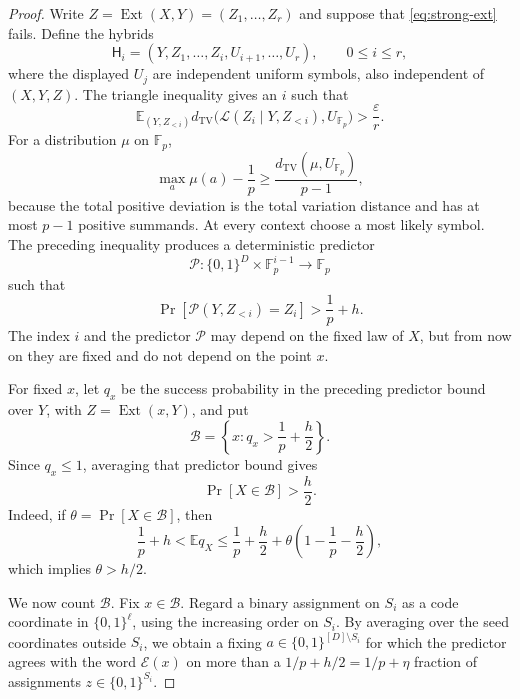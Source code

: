 \documentclass[11pt]{article}
\numberwithin{equation}{section}
\theoremstyle{definition}
\theoremstyle{remark}
\newcommand{\F}{\mathbb F}
\newcommand{\TV}{d_{\mathrm{TV}}}
\newcommand{\Ext}{\operatorname{Ext}}
\begin{document}
\begin{proof}
Write $Z=\Ext(X,Y)=(Z_1,\ldots,Z_r)$ and suppose that
\eqref{eq:strong-ext} fails.  Define the hybrids
\[
 \mathsf H_i=(Y,Z_1,\ldots,Z_i,U_{i+1},\ldots,U_r),
 \qquad 0\le i\le r,
\]
where the displayed $U_j$ are independent uniform symbols, also
independent of $(X,Y,Z)$.  The triangle inequality gives
an $i$ such that
\[
 \mathbb E_{(Y,Z_{<i})}
 \TV\bigl(\mathcal L(Z_i\mid Y,Z_{<i}),U_{\F_p}\bigr)
 >\frac{\varepsilon}{r}.
\]
For a distribution $\mu$ on $\F_p$,
\[
 \max_a\mu(a)-\frac1p
 \ge\frac{\TV(\mu,U_{\F_p})}{p-1},
\]
because the total positive deviation is the total variation distance and
has at most $p-1$ positive summands.  At every context choose a most
likely symbol.  The preceding inequality produces a deterministic
predictor
\[
 \mathcal P:\{0,1\}^D\times\F_p^{i-1}\to\F_p
\]
such that
\[
 \Pr[\mathcal P(Y,Z_{<i})=Z_i]>\frac1p+h.
\]
The index $i$ and the predictor $\mathcal P$ may depend on the fixed law of
$X$, but from now on they are fixed and do not depend on the point $x$.

For fixed $x$, let $q_x$ be the success probability in the preceding
predictor bound over $Y$, with $Z=\Ext(x,Y)$, and put
\[
 \mathcal B=\left\{x:q_x>\frac1p+\frac h2\right\}.
\]
Since $q_x\le1$, averaging that predictor bound gives
\begin{equation}\label{eq:bad-mass-lower}
 \Pr[X\in\mathcal B]>\frac h2.
\end{equation}
Indeed, if $\theta=\Pr[X\in\mathcal B]$, then
\[
 \frac1p+h<\mathbb E q_X
 \le\frac1p+\frac h2+
 \theta\left(1-\frac1p-\frac h2\right),
\]
which implies $\theta>h/2$.

We now count $\mathcal B$.  Fix $x\in\mathcal B$.  Regard a binary assignment
on $S_i$ as a code coordinate in $\{0,1\}^\ell$, using the increasing order
on $S_i$.  By averaging over the seed coordinates outside $S_i$, we obtain a fixing
$a\in\{0,1\}^{[D]\setminus S_i}$ for which the predictor agrees with the
word $\mathcal E(x)$ on more than a $1/p+h/2=1/p+\eta$ fraction of
assignments $z\in\{0,1\}^{S_i}$.


\end{proof}
\end{document}
